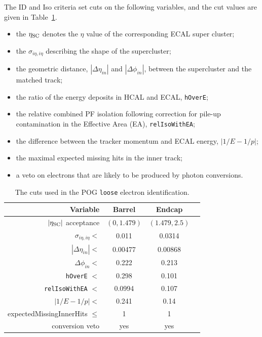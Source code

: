 \vspace{0.3cm}
The ID and Iso criteria set cuts on the following variables, and the cut values are given in Table~\ref{tab:electron-id}.

\begin{itemize}%
\item the $\eta_{\rm SC}$ denotes the $\eta$ value of the corresponding ECAL super cluster;
\item the $\sigma_{i\eta,i\eta}$ describing the shape of the supercluster;
\item the geometric distance, $|\Delta\eta_{in}|$ and $|\Delta\phi_{in}|$, between the supercluster and the matched track;
\item the ratio of the energy deposits in HCAL and ECAL, \texttt{hOverE};
\item the relative combined PF isolation following correction for
  pile-up contamination in the
  Effective Area (EA), \texttt{relIsoWithEA}; %
\item the difference between the tracker momentum and ECAL energy, $|1/E-1/p|$;
\item the maximal expected missing hits in the inner track;
\item a veto on electrons that are likely to be produced by photon conversions.
\end{itemize}



\begin{table}[htb!]
  \center
  \caption{The cuts used in the POG \texttt{loose} electron identification.}
  \label{tab:electron-id}
  \begin{tabular}{r c c c}
    \hline
    Variable & Barrel & Endcap \\
    \hline
    $|\eta_{\rm SC}|$ acceptance & $(0, 1.479)$ & $(1.479, 2.5)$\\
    $\sigma_{i\eta,i\eta} <$ & 0.011  & 0.0314 \\
    $|\Delta\eta_{in}| <$ & 0.00477  & 0.00868 \\
    $\Delta\phi_{in} <$ & 0.222  & 0.213 \\
    \texttt{hOverE} $<$ & 0.298  & 0.101 \\
    \texttt{relIsoWithEA} $<$ & 0.0994  & 0.107 \\
    $|1/E - 1/p| <$ & 0.241  & 0.14 \\
    expectedMissingInnerHits $\leq$ & 1  & 1 \\
    conversion veto & yes  & yes \\
    \hline
  \end{tabular}
\end{table}


